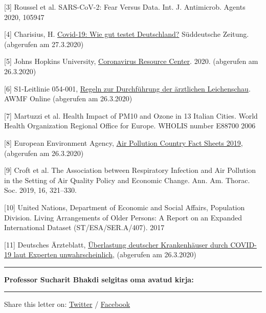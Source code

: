 {[}3{]} Roussel et al. SARS-CoV-2: Fear Versus Data. Int. J. Antimicrob.
Agents 2020, 105947

{[}4{]} Charisius, H.
\href{https://www.sueddeutsche.de/gesundheit/covid-19-coronavirus-testverfahren-1.4855487}{Covid-19:
Wie gut testet Deutschland?} Süddeutsche Zeitung. (abgerufen am
27.3.2020)

{[}5{]} Johns Hopkins University,
\href{https://coronavirus.jhu.edu/map.html}{Coronavirus Resource
Center}. 2020. (abgerufen am 26.3.2020)

{[}6{]} S1-Leitlinie 054-001,
\href{https://www.awmf.org/uploads/tx_szleitlinien/054-002l_S1_Regeln-zur-Durchfuehrung-der-aerztlichen-Leichenschau_2018-02_01.pdf}{Regeln
zur Durchführung der ärztlichen Leichenschau}. AWMF Online (abgerufen am
26.3.2020)

{[}7{]} Martuzzi et al. Health Impact of PM10 and Ozone in 13 Italian
Cities. World Health Organization Regional Office for Europe. WHOLIS
number E88700 2006

{[}8{]} European Environment Agency,
\href{https://www.eea.europa.eu/themes/air/country-fact-sheets/2019-country-fact-sheets}{Air
Pollution Country Fact Sheets 2019}, (abgerufen am 26.3.2020)

{[}9{]} Croft et al. The Association between Respiratory Infection and
Air Pollution in the Setting of Air Quality Policy and Economic Change.
Ann. Am. Thorac. Soc. 2019, 16, 321--330.

{[}10{]} United Nations, Department of Economic and Social Affairs,
Population Division. Living Arrange­ments of Older Persons: A Report on
an Expanded International Dataset (ST/ESA/SER.A/407). 2017

{[}11{]} Deutsches Ärzteblatt,
\href{https://www.aerzteblatt.de/nachrichten/111029/Ueberlastung-deutscher-Krankenhaeuser-durch-COVID-19-laut-Experten-unwahrscheinlich}{Überlastung
deutscher Krankenhäuser durch COVID-19 laut Experten unwahrscheinlich},
(abgerufen am 26.3.2020)

\begin{center}\rule{0.5\linewidth}{\linethickness}\end{center}

\textbf{Professor Sucharit Bhakdi selgitas oma avatud kirja:}

\begin{center}\rule{0.5\linewidth}{\linethickness}\end{center}

Share this letter on:
\href{https://twitter.com/intent/tweet?url=https://swprs.org/professor-sucharit-bhakdi-avalik-kiri-angela-merkelile/}{Twitter}
/
\href{https://www.facebook.com/share.php?u=https://swprs.org/professor-sucharit-bhakdi-avalik-kiri-angela-merkelile/}{Facebook}

